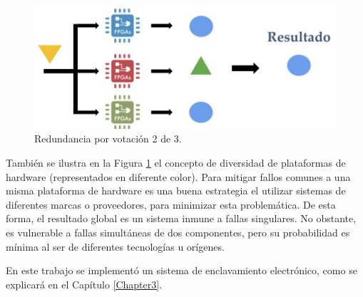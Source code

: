 			\begin{figure}[h]
				\centering
				\includegraphics[scale=.45]{./Figures/Redundancia}
				\caption{Redundancia por votación 2 de 3.}
				\label{fig:Redundancia}
			\end{figure}
			
			También se ilustra en la Figura \ref{fig:Redundancia} el concepto de diversidad de plataformas de hardware (representados en diferente color). Para mitigar fallos comunes a una misma plataforma de hardware es una buena estrategia el utilizar sistemas de diferentes marcas o proveedores, para minimizar esta problemática. De esta forma, el resultado global es un sistema inmune a fallas singulares. No obstante, es vulnerable a fallas simultáneas de dos componentes, pero su probabilidad es mínima al ser de diferentes tecnologías u orígenes.
			
			En este trabajo se implementó un sistema de enclavamiento electrónico, como se explicará en el Capítulo \ref{Chapter3}.
	 





